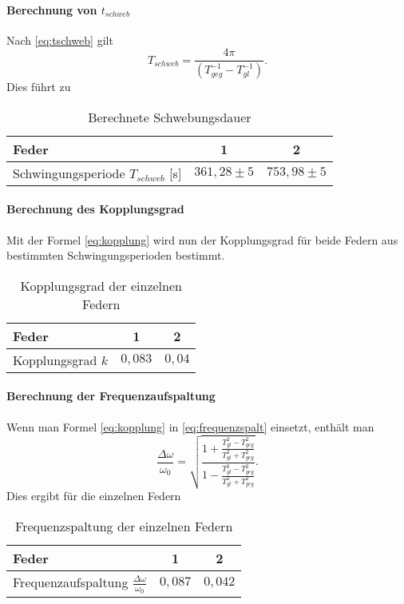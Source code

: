 \paragraph{Berechnung von $t_{schweb}$}
Nach \ref{eq:tschweb} gilt
\begin{equation}
T_{schweb}=\frac{4 \pi}{(T_{geg}^{-1}-T_{gl}^{-1})}.
\end{equation}
Dies führt zu
\begin{table}[H]
  \centering
  \begin{tabular}{l | c | c }
    Feder & 1 & 2\\ \hline
    Schwingungsperiode $T_{schweb}$ [s]& $361,28 \pm 5$ & $753,98 \pm 5$
    
  \end{tabular}
  \caption{Berechnete Schwebungsdauer }
  \label{tab:tschwebrech}
\end{table}
\paragraph{Berechnung des Kopplungsgrad}
Mit der Formel \ref{eq:kopplung} wird nun der Kopplungsgrad für beide Federn aus bestimmten Schwingungsperioden bestimmt.
\begin{table}[H]
  \centering
  \begin{tabular}{l | c | c }
    Feder & 1 & 2\\ \hline
    Kopplungsgrad $k$ & $0,083$ & $0,04$
    
  \end{tabular}
  \caption{Kopplungsgrad  der einzelnen Federn }
  \label{tab:kopllungsgrad}
\end{table}
\paragraph{Berechnung der Frequenzaufspaltung}
Wenn man Formel \ref{eq:kopplung} in \ref{eq:frequenzspalt} einsetzt, enthält man
\begin{equation}
\frac{\Delta \omega}{\omega_0}=\sqrt{\frac{1+\frac{T_{gl}^2-T_{geg}^2}{T_{gl}^2+T_{geg}^2}}{1-\frac{T_{gl}^2-T_{geg}^2}{T_{gl}^2+T_{geg}^2}}}.
\end{equation}
Dies ergibt für die einzelnen Federn
\begin{table}[H]
  \centering
  \begin{tabular}{l | c | c }
    Feder & 1 & 2\\ \hline
    Frequenzaufspaltung $\frac{\Delta \omega}{\omega_0}$& $0,087$ & $0,042$
    
  \end{tabular}
  \caption{Frequenzspaltung der einzelnen Federn }
  \label{tab:frequenzspalt}
\end{table}

